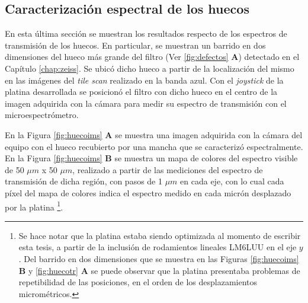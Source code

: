 \singlespacing
\subsection{Caracterización espectral de los huecos}
\label{sec:defctag}

\hspace{0.5cm}En esta última sección se muestran los resultados respecto de los espectros de transmisión de los huecos. En particular, se muestran un barrido en dos dimensiones del hueco más grande del filtro (Ver \ref{fig:defectos} \textbf{A}) detectado en el Capítulo \ref{chap:zeiss}. Se ubicó dicho hueco a partir de la localización del mismo en las imágenes del \textit{tile scan} realizado en la banda azul. Con el \textit{joystick} de la platina desarrollada se posicionó el filtro con dicho hueco en el centro de la imagen adquirida con la cámara para medir su espectro de transmisión con el microespectrómetro.

En la Figura \ref{fig:huecoims} \textbf{A} se muestra una imagen adquirida con la cámara del equipo con el hueco recubierto por una mancha que se caracterizó espectralmente. En la Figura \ref{fig:huecoims} \textbf{B} se muestra un mapa de colores del espectro visible de 50 $\mu m$ x 50 $\mu m$, realizado a partir de las mediciones del espectro de transmisión de dicha región, con pasos de 1 $\mu m$ en cada eje, con lo cual cada píxel del mapa de colores indica el espectro medido en cada micrón desplazado por la platina \footnote{Se hace notar que la platina estaba siendo optimizada al momento de escribir esta tesis, a partir de la inclusión de rodamientos lineales LM6LUU en el eje \textit{$y$}. Del barrido en dos dimensiones que se muestra en las Figuras \ref{fig:huecoims} \textbf{B} y \ref{fig:huecotr} \textbf{A} se puede observar que la platina presentaba problemas de repetibilidad de las posiciones, en el orden de los desplazamientos micrométricos.}. 

